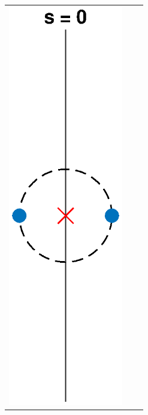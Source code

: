 \documentclass[thesis.tex]{subfiles}
\begin{document}
\begin{figure}[H]
\begin{center}
\begin{tabular}{ccc}
\includegraphics[width=5cm]{images/kreinbubbles/bubble0} &

\end{tabular}
\end{center}
\end{figure}
\end{document}
